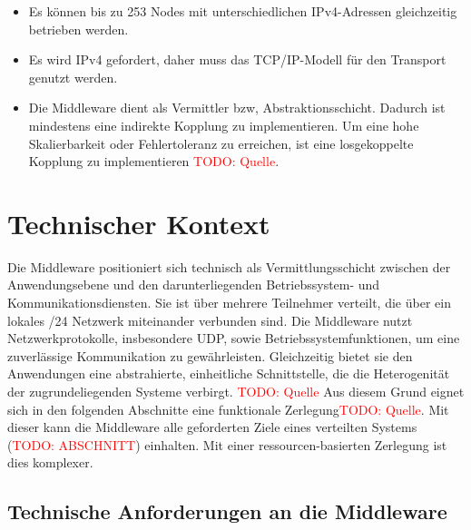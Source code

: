 \begin{itemize}
	\item Es können bis zu 253 Nodes mit unterschiedlichen IPv4-Adressen gleichzeitig betrieben werden.
	\item Es wird IPv4 gefordert, daher muss das TCP/IP-Modell für den Transport genutzt werden. 
	\item Die Middleware dient als Vermittler bzw, Abstraktionsschicht. Dadurch ist mindestens eine indirekte Kopplung zu implementieren. Um eine hohe Skalierbarkeit oder Fehlertoleranz zu erreichen, ist eine losgekoppelte Kopplung zu implementieren \textcolor{red}{TODO: Quelle}.
\end{itemize}

\section{Technischer Kontext}

Die Middleware positioniert sich technisch als Vermittlungsschicht zwischen der Anwendungsebene und den darunterliegenden Betriebssystem- und Kommunikationsdiensten. Sie ist über mehrere Teilnehmer verteilt, die über ein lokales /24 Netzwerk miteinander verbunden sind.
Die Middleware nutzt Netzwerkprotokolle, insbesondere UDP, sowie Betriebssystemfunktionen, um eine zuverlässige Kommunikation zu gewährleisten. Gleichzeitig bietet sie den Anwendungen eine abstrahierte, einheitliche Schnittstelle, die die Heterogenität der zugrundeliegenden Systeme verbirgt. \textcolor{red}{TODO: Quelle} Aus diesem Grund eignet sich in den folgenden Abschnitte eine funktionale Zerlegung\textcolor{red}{TODO: Quelle}. Mit dieser kann die Middleware alle geforderten Ziele eines verteilten Systems (\textcolor{red}{TODO: ABSCHNITT}) einhalten. Mit einer ressourcen-basierten Zerlegung ist dies komplexer.

\subsection{Technische Anforderungen an die Middleware}

